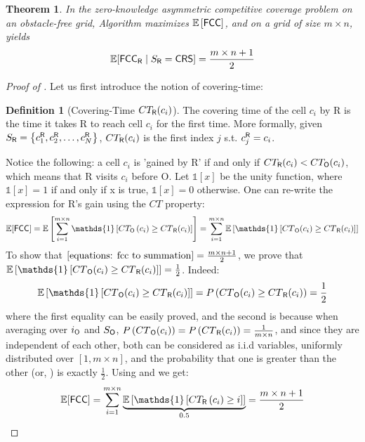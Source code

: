 \documentclass[letterpaper, 10 pt, conference]{ieeeconf}  %
\newtheorem{theorem}{Theorem}
\theoremstyle{definition}
\newtheorem{definition}{Definition}[section]
\newcommand{\rob}{{{\sf R}}\xspace}
\newcommand{\opp}{{{\sf O}}\xspace}
\newcommand{\fcc}{{{\sf{FCC}}}\xspace}
\newcommand{\crs}{{{\sf{CRS}}}\xspace}
\begin{document}
\begin{theorem} \label{theorems: crs optimality expected fcc}
In the zero-knowledge asymmetric competitive coverage problem on an obstacle-free grid, Algorithm \crs maximizes $\mathbb{E}\left[\fcc\right]$, and on a grid of size $m\times n$, \crs yields  \[\mathbb{E}[\fcc_\rob\mid S_\rob=\crs]=\frac{m\times n +1}{2}\]
\end{theorem}
\begin{proof}[Proof of ]
Let us first introduce the notion of covering-time:
\begin{definition}[Covering-Time $CT_\rob(c_i)$]
The covering time of the cell $c_i$ by \rob is the time it takes \rob to reach cell $c_i$ for the first time. More formally, given $S_{\rob}=\left\{c_1^{\rob},c_2^{\rob},\ldots,c_N^{\rob}\right\}$, $CT_\rob(c_i)$ is the first index $j$ s.t. $c_j^{\rob}=c_i$.
\end{definition}
Notice the following: a cell $c_i$ is 'gained by \rob' if and only if $CT_{\rob}(c_i) < CT_{\opp}(c_i)$, which means that \rob visits $c_i$ before \opp. Let $\mathds{1}[x]$ be the unity function, where $\mathds{1}[x]=1$ if and only if x is true, $\mathds{1}[x]=0$ otherwise. 
One can re-write the expression for \rob's gain using the $CT$ property:
\begin{dmath}
\mathbb{E}[\fcc]=\mathbb{E}\left[\sum_{i=1}^{m\times n}{\mathds{1}\left[CT_\opp\left(c_i\right)\geq {CT}_{\rob}(c_i)\right]}\right]=\sum_{i=1}^{m\times n}{\mathbb{E}\left[\mathds{1}\left[{CT}_{\opp}(c_i)\geq {CT}_{\rob}(c_i)\right]\right]}
\label{equations: fcc to summation}
\end{dmath}
To show that $\Cref{equations: fcc to summation}=\frac{m\times n+1}{2}$, we prove that $\mathbb{E}\left[\mathds{1}\left[{CT}_{\opp}(c_i)\geq {CT}_{\rob}(c_i)\right]\right]=\frac{1}{2}$. 
Indeed:
\begin{dmath}[compact]
\mathbb{E}\left[\mathds{1}\left[{CT}_{\opp}(c_i)\geq {CT}_{\rob}(c_i)\right]\right]={P\left({CT}_{\opp}(c_i)\geq {CT}_{\rob}(c_i)\right)}=\frac{1}{2}
\label{equations: expected to probability}
\end{dmath}
where the first equality can be easily proved, and the second is because when averaging over $i_\opp$ and $S_\opp$,  $P\left({CT}_{\opp}(c_i)\right) = P\left({CT}_{\rob}(c_i)\right)=\frac{1}{m\times n}$, and since they are independent of each other, both can be considered as i.i.d variables, uniformly distributed over $[1,m\times n]$, and the probability that one is greater than the other (or, ) is exactly $\frac{1}{2}$.
Using  and  we get:
\begin{dmath*}[compact]
\mathbb{E}[\fcc]=\sum_{i=1}^{m\times n}{\underbrace{\mathbb{E}\left[\mathds{1}\left[CT_{\rob}\left(c_i\right)\geq i\right]\right]}_{0.5}}=\frac{m\times n+1}{2}
\end{dmath*}
\end{proof}
\end{document}
